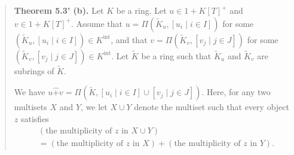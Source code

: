 \documentclass[numbers=enddot,12pt,final,onecolumn,notitlepage]{scrartcl}%
\begin{document}
\begin{quote}
\textbf{Theorem 5.3' (b).} Let $K$ be a ring. Let $u\in1+K\left[  T\right]
^{+}$ and $v\in1+K\left[  T\right]  ^{+}$. Assume that $u=\Pi\left(
\widetilde{K}_{u},\left[  u_{i}\mid i\in I\right]  \right)  $ for some
$\left(  \widetilde{K}_{u},\left[  u_{i}\mid i\in I\right]  \right)  \in
K^{\operatorname*{int}}$, and that $v=\Pi\left(  \widetilde{K}_{v},\left[
v_{j}\mid j\in J\right]  \right)  $ for some $\left(  \widetilde{K}%
_{v},\left[  v_{j}\mid j\in J\right]  \right)  \in K^{\operatorname*{int}}$.
Let $\widetilde{K}$ be a ring such that $\widetilde{K}_{u}$ and $\widetilde{K}%
_{v}$ are subrings of $\widetilde{K}$.

We have $u\widehat{+}v=\Pi\left(  \widetilde{K},\left[  u_{i}\mid i\in
I\right]  \cup\left[  v_{j}\mid j\in J\right]  \right)  $. Here, for any two
multisets $X$ and $Y$, we let $X\cup Y$ denote the multiset such that every
object $z$ satisfies%
\begin{align*}
&  \left(  \text{the multiplicity of }z\text{ in }X\cup Y\right) \\
&  =\left(  \text{the multiplicity of }z\text{ in }X\right)  +\left(
\text{the multiplicity of }z\text{ in }Y\right)  .
\end{align*}



\end{quote}
\end{document}
